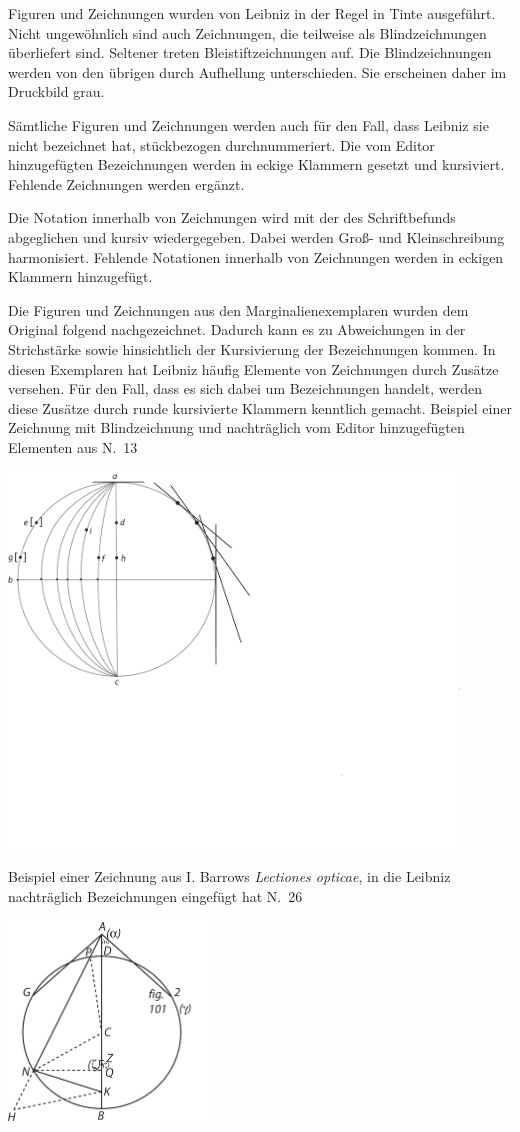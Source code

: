 Figuren und Zeichnungen wurden von Leibniz in der Regel in Tinte aus\-gef\"{u}hrt. Nicht ungew\"{o}hnlich sind auch Zeichnungen, die teilweise als Blind\-zeichnungen \"{u}berliefert sind. Seltener treten Bleistiftzeichnungen auf. Die Blind\-zeichnungen werden von den \"{u}brigen durch Aufhellung unterschieden. Sie erscheinen daher im Druckbild grau.\par
S\"{a}mtliche Figuren und Zeichnungen werden auch f\"{u}r den Fall, dass Leibniz sie nicht bezeichnet hat, st\"{u}ckbezogen durchnummeriert. Die vom Editor hinzugef\"{u}gten Bezeichnungen werden in eckige Klammern gesetzt und kursiviert. Fehlende Zeichnungen werden erg\"{a}nzt.\par
Die Notation innerhalb von Zeichnungen wird mit der des Schriftbefunds abgeglichen und kursiv wiedergegeben. Dabei werden Groß- und Kleinschreibung harmonisiert. Fehlende Notationen innerhalb von Zeichnungen werden in eckigen Klammern hinzugef\"{u}gt. \par
Die Figuren und Zeichnungen aus den Marginalienexemplaren wurden dem Original folgend nachgezeichnet. Dadurch kann es zu Abweichungen in der Strich\-st\"{a}rke sowie hinsichtlich der Kursivierung der Bezeichnungen kommen. In diesen Exemplaren hat Leibniz h\"{a}ufig Elemente von Zeichnungen durch Zus\"{a}tze versehen. F\"{u}r den Fall, dass es sich dabei um Bezeichnungen handelt, werden diese Zus\"{a}tze durch runde kursivierte Klammern kenntlich gemacht.\clearpage
Beispiel einer Zeichnung mit Blindzeichnung und nachtr\"{a}glich vom Editor hinzugef\"{u}gten Elementen aus N.~13 
\begin{center}
  \includegraphics[width=0.9\textwidth]{images/38_21v}
\end{center}
\clearpage
Beispiel einer Zeichnung aus I. Barrows \textit{Lectiones opticae}, in die Leibniz nachtr\"{a}glich Bezeichnungen eingef\"{u}gt hat N.~26
\begin{center}
    \includegraphics[width=0.4\textwidth]{images/T8_Barrow-2}
\end{center}
\clearpage
